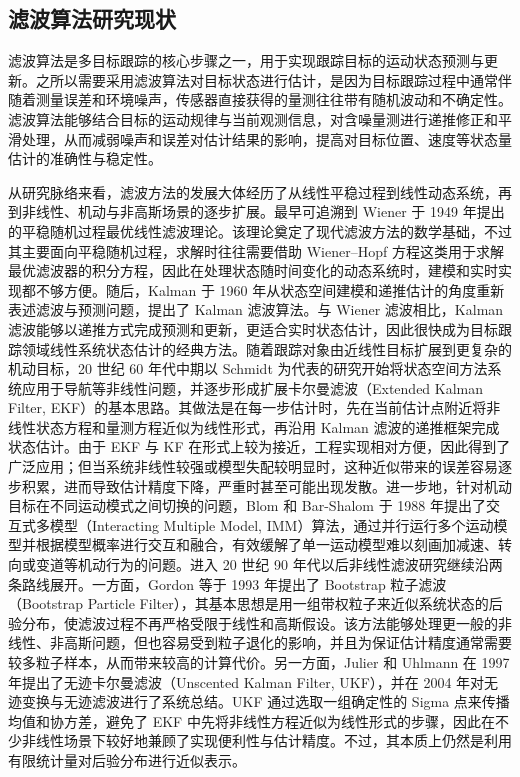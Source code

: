 \documentclass{xdupgthesis}
\begin{document}
\subsection{滤波算法研究现状}
滤波算法是多目标跟踪的核心步骤之一，用于实现跟踪目标的运动状态预测与更新。之所以需要采用滤波算法对目标状态进行估计，是因为目标跟踪过程中通常伴随着测量误差和环境噪声，传感器直接获得的量测往往带有随机波动和不确定性。滤波算法能够结合目标的运动规律与当前观测信息，对含噪量测进行递推修正和平滑处理，从而减弱噪声和误差对估计结果的影响，提高对目标位置、速度等状态量估计的准确性与稳定性\cite{barshalomli1995multitarget}。

从研究脉络来看，滤波方法的发展大体经历了从线性平稳过程到线性动态系统，再到非线性、机动与非高斯场景的逐步扩展。最早可追溯到 Wiener 于 1949 年提出的平稳随机过程最优线性滤波理论\cite{wiener1949extrapolation}。该理论奠定了现代滤波方法的数学基础，不过其主要面向平稳随机过程，求解时往往需要借助 Wiener--Hopf 方程这类用于求解最优滤波器的积分方程，因此在处理状态随时间变化的动态系统时，建模和实时实现都不够方便。随后，Kalman 于 1960 年从状态空间建模和递推估计的角度重新表述滤波与预测问题，提出了 Kalman 滤波算法\cite{kalman1960linearfiltering}。与 Wiener 滤波相比，Kalman 滤波能够以递推方式完成预测和更新，更适合实时状态估计，因此很快成为目标跟踪领域线性系统状态估计的经典方法。随着跟踪对象由近线性目标扩展到更复杂的机动目标，20 世纪 60 年代中期以 Schmidt 为代表的研究开始将状态空间方法系统应用于导航等非线性问题，并逐步形成扩展卡尔曼滤波（Extended Kalman Filter, EKF）的基本思路\cite{schmidt1966statespace}。其做法是在每一步估计时，先在当前估计点附近将非线性状态方程和量测方程近似为线性形式，再沿用 Kalman 滤波的递推框架完成状态估计。由于 EKF 与 KF 在形式上较为接近，工程实现相对方便，因此得到了广泛应用；但当系统非线性较强或模型失配较明显时，这种近似带来的误差容易逐步积累，进而导致估计精度下降，严重时甚至可能出现发散。进一步地，针对机动目标在不同运动模式之间切换的问题，Blom 和 Bar-Shalom 于 1988 年提出了交互式多模型（Interacting Multiple Model, IMM）算法\cite{blom1988imm}，通过并行运行多个运动模型并根据模型概率进行交互和融合，有效缓解了单一运动模型难以刻画加减速、转向或变道等机动行为的问题。进入 20 世纪 90 年代以后非线性滤波研究继续沿两条路线展开。一方面，Gordon 等于 1993 年提出了 Bootstrap 粒子滤波（Bootstrap Particle Filter），其基本思想是用一组带权粒子来近似系统状态的后验分布，使滤波过程不再严格受限于线性和高斯假设\cite{gordon1993bootstrap}。该方法能够处理更一般的非线性、非高斯问题，但也容易受到粒子退化的影响，并且为保证估计精度通常需要较多粒子样本，从而带来较高的计算代价。另一方面，Julier 和 Uhlmann 在 1997 年提出了无迹卡尔曼滤波（Unscented Kalman Filter, UKF），并在 2004 年对无迹变换与无迹滤波进行了系统总结\cite{julier1997ukf,julier2004unscented}。UKF 通过选取一组确定性的 Sigma 点来传播均值和协方差，避免了 EKF 中先将非线性方程近似为线性形式的步骤，因此在不少非线性场景下较好地兼顾了实现便利性与估计精度。不过，其本质上仍然是利用有限统计量对后验分布进行近似表示。
\end{document}
